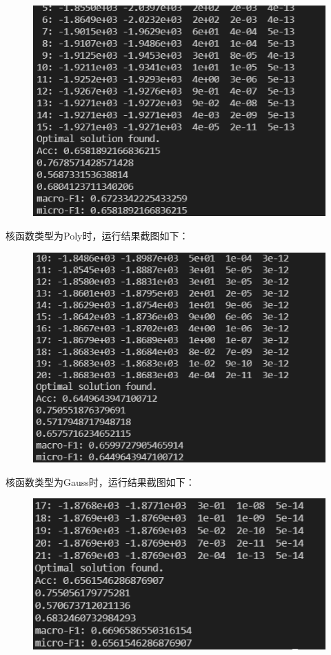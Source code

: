 \documentclass{ctexart}
\begin{document}
\begin{figure}[htbp]
    \centering
    \includegraphics[scale=0.5]{linear1.png}

\end{figure}
\par 核函数类型为Poly时，运行结果截图如下：
\begin{figure}[H]
    \centering
    \includegraphics[scale=0.5]{Ploy.png}

\end{figure}
\par 核函数类型为Gauss时，运行结果截图如下：
\begin{figure}[H]
    \centering
    \includegraphics[scale=0.5]{gauss.png}

\end{figure}
\end{document}

